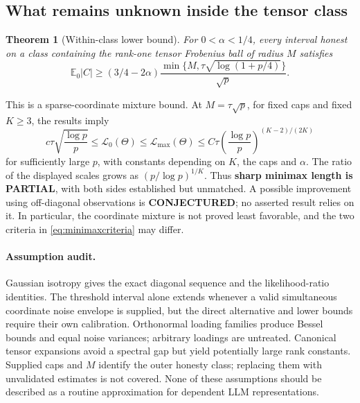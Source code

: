\documentclass[11pt]{article}
\newtheorem{theorem}{Theorem}
\theoremstyle{remark}
\newcommand{\E}{\mathbb E}
\newcommand{\calL}{\mathcal L}
\begin{document}
\subsection{What remains unknown inside the tensor class}\label{sec:gap}

\begin{theorem}[Within-class lower bound]\label{thm:jointlower}
For $0<\alpha<1/4$, every interval honest on a class containing the rank-one tensor Frobenius ball of radius $M$ satisfies
\begin{equation}\label{eq:jointlower}
 \E_0|C|\ge(3/4-2\alpha)
 \frac{\min\{M,\tau\sqrt{\log(1+p/4)}\}}{\sqrt p}.
\end{equation}
\end{theorem}

This is a sparse-coordinate mixture bound. At $M=\tau\sqrt p$, for fixed caps and fixed $K\ge3$, the results imply
\begin{equation}\label{eq:gap}
 c\tau\sqrt{\frac{\log p}p}
 \le\calL_0(\Theta)\le\calL_{\max}(\Theta)
 \le C\tau\left(\frac{\log p}p\right)^{(K-2)/(2K)}
\end{equation}
for sufficiently large $p$, with constants depending on $K$, the caps and $\alpha$. The ratio of the displayed scales grows as $(p/\log p)^{1/K}$. Thus \textbf{sharp minimax length is PARTIAL}, with both sides established but unmatched. A possible improvement using off-diagonal observations is \textbf{CONJECTURED}; no asserted result relies on it. In particular, the coordinate mixture is not proved least favorable, and the two criteria in \eqref{eq:minimaxcriteria} may differ.

\paragraph{Assumption audit.}
Gaussian isotropy gives the exact diagonal sequence and the likelihood-ratio identities. The threshold interval alone extends whenever a valid simultaneous coordinate noise envelope is supplied, but the direct alternative and lower bounds require their own calibration. Orthonormal loading families produce Bessel bounds and equal noise variances; arbitrary loadings are untreated. Canonical tensor expansions avoid a spectral gap but yield potentially large rank constants. Supplied caps and $M$ identify the outer honesty class; replacing them with unvalidated estimates is not covered. None of these assumptions should be described as a routine approximation for dependent LLM representations.
\end{document}
